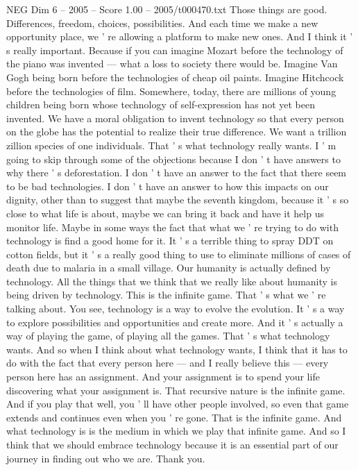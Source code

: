 \begin{textsample}{NEG Dim 6 – 2005 – Score 1.00 – 2005/t000470.txt}
Those things are good.
Differences, freedom, choices, possibilities.
And each time we make a new opportunity place, we ' re allowing a platform to make new ones.
And I think it ' s really important.
Because if you can imagine Mozart before the technology of the piano was invented — what a loss to society there would be.
Imagine Van Gogh being born before the technologies of cheap oil paints.
Imagine Hitchcock before the technologies of film.
Somewhere, today, there are millions of young children being born whose technology of self-expression has not yet been invented.
We have a moral obligation to invent technology so that every person on the globe has the potential to realize their true difference.
We want a trillion zillion species of one individuals.
That ' s what technology really wants.
I ' m going to skip through some of the objections because I don ' t have answers to why there ' s deforestation.
I don ' t have an answer to the fact that there seem to be bad technologies.
I don ' t have an answer to how this impacts on our dignity, other than to suggest that maybe the seventh kingdom, because it ' s so close to what life is about, maybe we can bring it back and have it help us monitor life.
Maybe in some ways the fact that what we ' re trying to do with technology is find a good home for it.
It ' s a terrible thing to spray DDT on cotton fields, but it ' s a really good thing to use to eliminate millions of cases of death due to malaria in a small village.
Our humanity is actually defined by technology.
All the things that we think that we really like about humanity is being driven by technology.
This is the infinite game.
That ' s what we ' re talking about.
You see, technology is a way to evolve the evolution.
It ' s a way to explore possibilities and opportunities and create more.
And it ' s actually a way of playing the game, of playing all the games.
That ' s what technology wants.
And so when I think about what technology wants, I think that it has to do with the fact that every person here — and I really believe this — every person here has an assignment.
And your assignment is to spend your life discovering what your assignment is.
That recursive nature is the infinite game.
And if you play that well, you ' ll have other people involved, so even that game extends and continues even when you ' re gone.
That is the infinite game.
And what technology is is the medium in which we play that infinite game.
And so I think that we should embrace technology because it is an essential part of our journey in finding out who we are.
Thank you.

\end{textsample}
